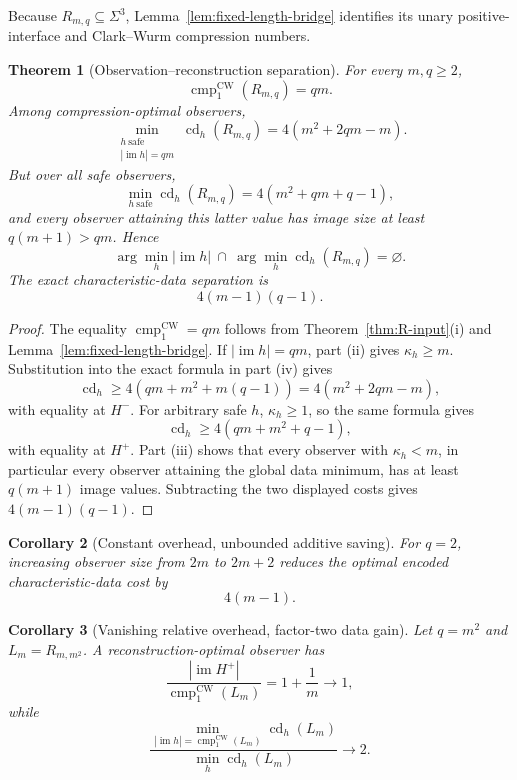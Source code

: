 \documentclass[11pt]{article}
\newtheorem{theorem}{Theorem}[section]
\newtheorem{corollary}[theorem]{Corollary}
\theoremstyle{definition}
\theoremstyle{remark}
\newcommand{\im}{\operatorname{im}}
\newcommand{\cmp}{\operatorname{cmp}}
\newcommand{\cd}{\operatorname{cd}}
\begin{document}
Because $R_{m,q}\subseteq\Sigma^3$, Lemma~\ref{lem:fixed-length-bridge}
identifies its unary positive-interface and Clark--Wurm compression numbers.

\begin{theorem}[Observation--reconstruction separation]
\label{thm:main-separation}
For every $m,q\ge2$,
\[
 \boxed{\cmp_1^{\mathrm{CW}}(R_{m,q})=qm.}
\]
Among compression-optimal observers,
\[
 \boxed{
 \min_{\substack{h\ \mathrm{safe}\\|\im h|=qm}}
 \cd_h(R_{m,q})
 =4(m^2+2qm-m).
 }
\]
But over all safe observers,
\[
 \boxed{
 \min_{h\ \mathrm{safe}}\cd_h(R_{m,q})
 =4(m^2+qm+q-1),
 }
\]
and every observer attaining this latter value has image size at least
$q(m+1)>qm$.  Hence
\[
 \arg\min_h |\im h|
 \ \cap\
 \arg\min_h \cd_h(R_{m,q})
 =\varnothing.
\]
The exact characteristic-data separation is
\[
 \boxed{4(m-1)(q-1).}
\]
\end{theorem}

\begin{proof}
The equality $\cmp_1^{\mathrm{CW}}=qm$ follows from
Theorem~\ref{thm:R-input}(i) and Lemma~\ref{lem:fixed-length-bridge}.
If $|\im h|=qm$, part (ii) gives $\kappa_h\ge m$.  Substitution into the exact
formula in part (iv) gives
\[
 \cd_h\ge4(qm+m^2+m(q-1))
 =4(m^2+2qm-m),
\]
with equality at $H^-$.  For arbitrary safe $h$, $\kappa_h\ge1$, so the same
formula gives
\[
 \cd_h\ge4(qm+m^2+q-1),
\]
with equality at $H^+$.  Part (iii) shows that every observer with
$\kappa_h<m$, in particular every observer attaining the global data minimum,
has at least $q(m+1)$ image values.  Subtracting the two displayed costs gives
$4(m-1)(q-1)$.
\end{proof}

\begin{corollary}[Constant overhead, unbounded additive saving]
For $q=2$, increasing observer size from $2m$ to $2m+2$ reduces the optimal
encoded characteristic-data cost by
\[
 4(m-1).
\]
\end{corollary}

\begin{corollary}[Vanishing relative overhead, factor-two data gain]
\label{cor:factor-two}
Let $q=m^2$ and $L_m=R_{m,m^2}$.  A reconstruction-optimal observer has
\[
 \frac{|\im H^+|}{\cmp_1^{\mathrm{CW}}(L_m)}
 =1+\frac1m\longrightarrow1,
\]
while
\[
 \frac{
 \min_{|\im h|=\cmp_1^{\mathrm{CW}}(L_m)}\cd_h(L_m)
 }{
 \min_h\cd_h(L_m)
 }
 \longrightarrow2.
\]
\end{corollary}
\end{document}
